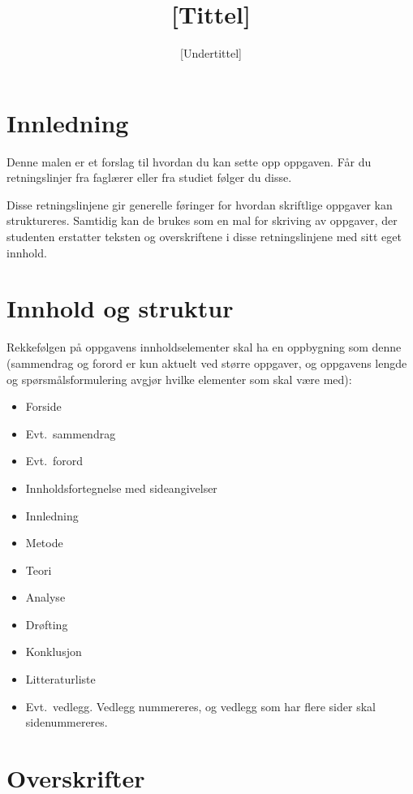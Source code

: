 \documentclass{USN-BSc}
\title{[Tittel]}
\subtitle{[Undertittel]}
\begin{document}
\USNcover

\tableofcontents
\clearpage

\section{Innledning}

Denne malen er et forslag til hvordan du kan sette opp oppgaven. Får du
retningslinjer fra faglærer eller fra studiet følger du disse.

Disse retningslinjene gir generelle føringer for hvordan skriftlige oppgaver
kan struktureres. Samtidig kan de brukes som en mal for skriving av oppgaver,
der studenten erstatter teksten og overskriftene i disse retningslinjene med
sitt eget innhold.

\section{Innhold og struktur}

Rekkefølgen på oppgavens innholdselementer skal ha en oppbygning som denne
(sammendrag og forord er kun aktuelt ved større oppgaver, og oppgavens lengde
og spørsmålsformulering avgjør hvilke elementer som skal være med):

\begin{itemize}
  \item[] Forside
  \item[] Evt.\ sammendrag
  \item[] Evt.\ forord
  \item[] Innholdsfortegnelse med sideangivelser
  \item[] Innledning
  \item[] Metode
  \item[] Teori
  \item[] Analyse
  \item[] Drøfting
  \item[] Konklusjon
  \item[] Litteraturliste
  \item[] Evt.\ vedlegg. Vedlegg nummereres, og vedlegg som har flere sider
          skal sidenummereres.
\end{itemize}

\section{Overskrifter}
\end{document}
